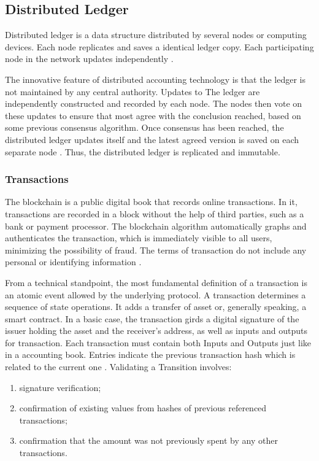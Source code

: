 \subsection{Distributed Ledger}\label{sec:livro}
Distributed ledger is a data structure distributed by several nodes or computing devices. Each node replicates and saves a identical ledger copy. Each participating node in the network updates independently \cite{greve2018blockchain}.

The innovative feature of distributed accounting technology is that the ledger is not maintained by any central authority. Updates to The ledger are independently constructed and recorded by each node. The nodes then vote on these updates to ensure that most agree with the conclusion reached, based on some previous consensus algorithm. Once consensus has been reached, the distributed ledger updates itself and the latest agreed version is saved on each separate node \cite{swan2015blockchain}. Thus, the distributed ledger is replicated and immutable. 

\subsubsection{Transactions}\label{sec:transac}
The blockchain is a public digital book that records online transactions. In it, transactions are recorded in a block without the help of third parties, such as a bank or payment processor. The blockchain algorithm automatically graphs and authenticates the transaction, which is immediately visible to all users, minimizing the possibility of fraud. The terms of transaction do not include any personal or identifying information \cite{Bankrate2018}.

From a technical standpoint, the most fundamental definition of a transaction is an atomic event allowed by the underlying protocol. A transaction determines a sequence of state operations. It adds a transfer of asset or, generally speaking, a smart contract. In a basic case, the transaction girds a digital signature of the issuer holding the asset and the receiver's address, as well as inputs and outputs for transaction. Each transaction must contain both Inputs and Outputs just like in a accounting book. Entries indicate the previous transaction hash which is related to the current one \cite{greve2018blockchain}. Validating a Transition involves:

\begin{enumerate}
	\item signature verification;
	\item confirmation of existing values from hashes of previous referenced transactions;
	\item confirmation that the amount was not previously spent by any other transactions.
\end{enumerate}

